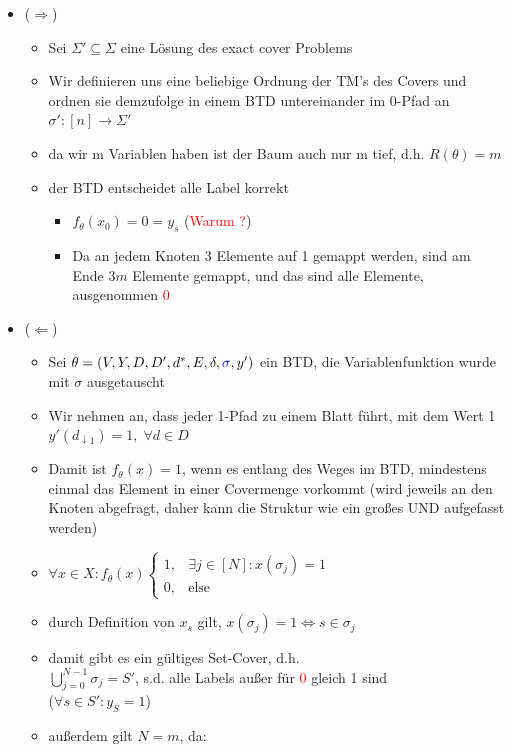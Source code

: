 \documentclass[12pt,a4paper]{article}
\newcommand{\red}[1]{\textcolor{red} {#1}}
\newcommand{\blue}[1]{\textcolor{blue} {#1}}
\begin{document}
\begin{itemize}
\item ($\Rightarrow$)
\begin{itemize}
\item Sei $\Sigma' \subseteq \Sigma$ eine Lösung des exact cover Problems
\item Wir definieren uns eine beliebige Ordnung der TM's des Covers und ordnen sie demzufolge in einem BTD untereinander im 0-Pfad an\\
$\sigma':[n]\rightarrow\Sigma'$
\item da wir m Variablen haben ist der Baum auch nur m tief, d.h. $R(\theta) = m$
\item der BTD entscheidet alle Label korrekt
\begin{itemize}
\item $f_\theta(x_0) = 0 = y_s$ (\red{Warum ?})
\item Da an jedem Knoten 3 Elemente auf 1 gemappt werden, sind am Ende $3m$ Elemente gemappt, und das sind alle Elemente, ausgenommen \red{0}
\end{itemize}
\end{itemize}
\item ($\Leftarrow$)
\begin{itemize}
\item Sei $\theta = (V,Y,D,D',d^*,E,\delta,\blue{\sigma},y')$ ein BTD, die Variablenfunktion wurde mit $\sigma$ ausgetauscht
\item Wir nehmen an, dass jeder 1-Pfad zu einem Blatt führt, mit dem Wert 1 $y'(d_{\downarrow 1}) = 1,\; \forall d \in D$
\item Damit ist $f_\theta(x) = 1$, wenn es entlang des Weges im BTD, mindestens einmal das Element in einer Covermenge vorkommt (wird jeweils an den Knoten abgefragt, daher kann die Struktur wie ein großes UND aufgefasst werden)
\item $\forall x \in X: f_\theta(x) \begin{cases}1, & \exists j\in [N]: x(\sigma_j)=1\\0, & \text{else}\end{cases}$
\item durch Definition von $x_s$ gilt, $x(\sigma_j) = 1 \Leftrightarrow s \in \sigma_j$
\item damit gibt es ein gültiges Set-Cover, d.h.\\
$\displaystyle \bigcup_{j=0}^{N-1} \sigma_j = S'$, s.d. alle Labels außer für \red{0} gleich 1 sind\\
($\forall s \in S': y_S = 1$)
\item außerdem gilt $N=m$, da:

\end{itemize}
\end{itemize}
\end{document}
